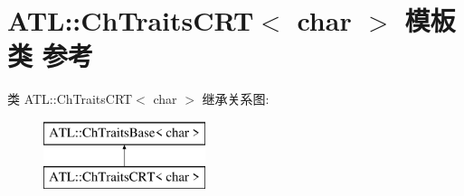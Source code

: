 \hypertarget{class_a_t_l_1_1_ch_traits_c_r_t_3_01char_01_4}{}\section{A\+TL\+:\+:Ch\+Traits\+C\+RT$<$ char $>$ 模板类 参考}
\label{class_a_t_l_1_1_ch_traits_c_r_t_3_01char_01_4}
类 A\+TL\+:\+:Ch\+Traits\+C\+RT$<$ char $>$ 继承关系图\+:\begin{figure}[H]
\begin{center}
\leavevmode
\includegraphics[height=2.000000cm]{class_a_t_l_1_1_ch_traits_c_r_t_3_01char_01_4}
\end{center}
\end{figure}
